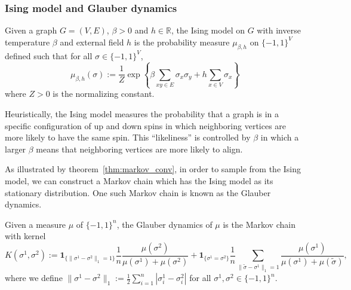 \begin{definition}
  
\end{definition}

\subsubsection{Ising model and Glauber dynamics}

\begin{definition}
  Given a graph \(G = (V, E)\), \(\beta > 0\) and \(h \in \mathbb{R}\), the Ising model on \(G\) 
  with inverse temperature \(\beta\) and external field \(h\) is the probability measure \(\mu_{\beta, h}\) on 
  \(\{-1, 1\}^V\) defined such that for all \(\sigma \in \{-1, 1\}^V\),
  \[\mu_{\beta, h}(\sigma) := 
    \frac{1}{Z} \exp\left\{\beta \sum_{xy \in E} \sigma_x \sigma_y + h \sum_{x \in V} \sigma_x\right\}\]
  where \(Z > 0\) is the normalizing constant.
\end{definition}

Heuristically, the Ising model measures the probability that a graph is in a specific configuration of 
up and down spins in which neighboring vertices are more likely to have the same spin. This ``likeliness'' 
is controlled by \(\beta\) in which a larger \(\beta\) means that neighboring vertices are more likely to
align. 

As illustrated by theorem~\ref{thm:markov_conv}, in order to sample from the Ising model, we can 
construct a Markov chain which has the Ising model as its stationary distribution. One such Markov chain 
is known as the Glauber dynamics.

\begin{definition}
  Given a measure \(\mu\) of \(\{-1, 1\}^n\), the Glauber dynamics of \(\mu\) is the Markov chain 
  with kernel 
  \begin{equation}\label{eq:glauber_ker}
    K(\sigma^1, \sigma^2) := 
      \mathbf{1}_{\{\|\sigma^1 - \sigma^2\|_1 = 1\}}\frac{1}{n}\frac{\mu(\sigma^2)}{\mu(\sigma^1) + \mu(\sigma^2)}
    + \mathbf{1}_{\{\sigma^1 = \sigma^2\}} \frac{1}{n}\sum_{\|\tilde \sigma - \sigma^1\|_1 = 1}
    \frac{\mu(\sigma^1)}{\mu(\sigma^1) + \mu(\tilde \sigma)},
  \end{equation}
  where we define \(\|\sigma^1 - \sigma^2\|_1 := \frac{1}{2}\sum_{i = 1}^n |\sigma_i^1 - \sigma_i^2|\) 
  for all \(\sigma^1, \sigma^2 \in \{-1, 1\}^n\).
\end{definition}

